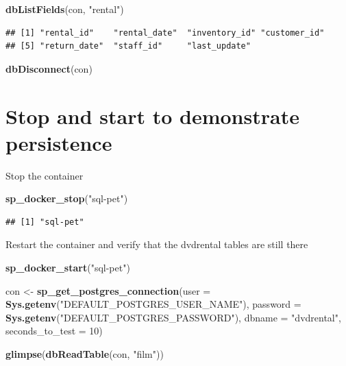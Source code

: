 \documentclass[]{book}
\newenvironment{Shaded}{\begin{snugshade}}{\end{snugshade}}
\newcommand{\DataTypeTok}[1]{\textcolor[rgb]{0.13,0.29,0.53}{#1}}
\newcommand{\DecValTok}[1]{\textcolor[rgb]{0.00,0.00,0.81}{#1}}
\newcommand{\KeywordTok}[1]{\textcolor[rgb]{0.13,0.29,0.53}{\textbf{#1}}}
\newcommand{\NormalTok}[1]{#1}
\newcommand{\StringTok}[1]{\textcolor[rgb]{0.31,0.60,0.02}{#1}}
\theoremstyle{definition}
\theoremstyle{definition}
\theoremstyle{definition}
\theoremstyle{remark}
\begin{document}
\begin{Shaded}
\begin{Highlighting}[]
\KeywordTok{dbListFields}\NormalTok{(con, }\StringTok{"rental"}\NormalTok{)}
\end{Highlighting}
\end{Shaded}

\begin{verbatim}
## [1] "rental_id"    "rental_date"  "inventory_id" "customer_id" 
## [5] "return_date"  "staff_id"     "last_update"
\end{verbatim}

\begin{Shaded}
\begin{Highlighting}[]
\KeywordTok{dbDisconnect}\NormalTok{(con)}
\end{Highlighting}
\end{Shaded}

\hypertarget{stop-and-start-to-demonstrate-persistence}{%
\section{Stop and start to demonstrate
persistence}\label{stop-and-start-to-demonstrate-persistence}}

Stop the container

\begin{Shaded}
\begin{Highlighting}[]
\KeywordTok{sp_docker_stop}\NormalTok{(}\StringTok{"sql-pet"}\NormalTok{)}
\end{Highlighting}
\end{Shaded}

\begin{verbatim}
## [1] "sql-pet"
\end{verbatim}

Restart the container and verify that the dvdrental tables are still
there

\begin{Shaded}
\begin{Highlighting}[]
\KeywordTok{sp_docker_start}\NormalTok{(}\StringTok{"sql-pet"}\NormalTok{)}

\NormalTok{con <-}\StringTok{ }\KeywordTok{sp_get_postgres_connection}\NormalTok{(}\DataTypeTok{user =} \KeywordTok{Sys.getenv}\NormalTok{(}\StringTok{"DEFAULT_POSTGRES_USER_NAME"}\NormalTok{),}
                         \DataTypeTok{password =} \KeywordTok{Sys.getenv}\NormalTok{(}\StringTok{"DEFAULT_POSTGRES_PASSWORD"}\NormalTok{),}
                         \DataTypeTok{dbname =} \StringTok{"dvdrental"}\NormalTok{,}
                         \DataTypeTok{seconds_to_test =} \DecValTok{10}\NormalTok{)}

\KeywordTok{glimpse}\NormalTok{(}\KeywordTok{dbReadTable}\NormalTok{(con, }\StringTok{"film"}\NormalTok{))}
\end{Highlighting}
\end{Shaded}
\end{document}
